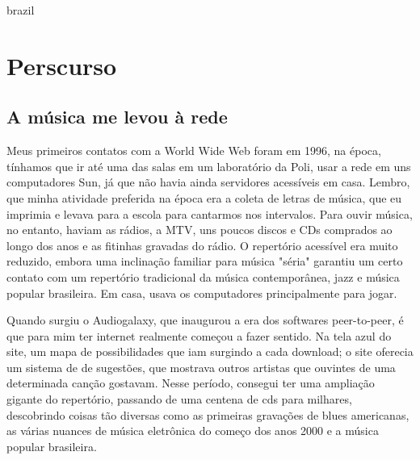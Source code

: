 %


\begin{otherlanguage*}{brazil}

    \chapter
    [Percurso]
    {Perscurso}


    \begin{flushright}
     
    \end{flushright}



\linespread{1.5}

    \section{A música me levou à rede}
    
    Meus primeiros contatos com a World Wide Web foram em 1996, na época, tínhamos que ir até uma das salas em um laboratório da Poli, usar a rede em uns computadores Sun, já que não havia ainda servidores acessíveis em casa. Lembro, que minha atividade preferida na época era a coleta de letras de música, que eu imprimia e levava para a escola para cantarmos nos intervalos. Para ouvir música, no entanto, haviam as rádios, a MTV, uns poucos discos e CDs comprados ao longo dos anos e as fitinhas gravadas do rádio. O repertório acessível era muito reduzido, embora uma inclinação familiar para música "séria" garantiu um certo contato com um repertório tradicional da música contemporânea, jazz e música popular brasileira. Em casa, usava os computadores principalmente para jogar.

Quando surgiu o Audiogalaxy, que inaugurou a era dos softwares peer-to-peer, é que para mim ter internet realmente começou a fazer sentido. Na tela azul do site, um mapa de possibilidades que iam surgindo a cada download; o site oferecia um sistema de de sugestões, que mostrava outros artistas que ouvintes de uma determinada canção gostavam. Nesse período, consegui ter uma ampliação gigante do repertório, passando de uma centena de cds para milhares, descobrindo coisas tão diversas como as primeiras gravações de blues americanas, as várias nuances de música eletrônica do começo dos anos 2000 e a música popular brasileira. 


\end{otherlanguage*}
